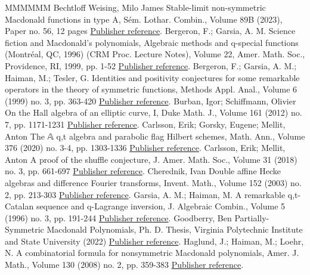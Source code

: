 \documentclass[11pt]{article}
\theoremstyle{definition}
\numberwithin{equation}{section}
\begin{document}
\begin{thebibliography}{MMMMMM}
 Bechtloff Weising, Milo James Stable-limit non-symmetric Macdonald functions in type A, Sém. Lothar. Combin., Volume 89B (2023), Paper no. 56, 12 pages \href{https://alco.centre-mersenne.org/articles/10.5802/alco.395/#MBW}{Publisher reference}.
 Bergeron, F.; Garsia, A. M. Science fiction and Macdonald’s polynomials, Algebraic methods and q-special functions (Montréal, QC, 1996) (CRM Proc. Lecture Notes), Volume 22, Amer. Math. Soc., Providence, RI, 1999, pp. 1-52 \href{https://alco.centre-mersenne.org/articles/10.5802/alco.395/#BGSciFi}{Publisher reference}.
 Bergeron, F.; Garsia, A. M.; Haiman, M.; Tesler, G. Identities and positivity conjectures for some remarkable operators in the theory of symmetric functions, Methods Appl. Anal., Volume 6 (1999) no. 3, pp. 363-420 \href{https://alco.centre-mersenne.org/articles/10.5802/alco.395/#BGHT}{Publisher reference}.
 Burban, Igor; Schiffmann, Olivier On the Hall algebra of an elliptic curve, I, Duke Math. J., Volume 161 (2012) no. 7, pp. 1171-1231 \href{https://alco.centre-mersenne.org/articles/10.5802/alco.395/#BS}{Publisher reference}.
 Carlsson, Erik; Gorsky, Eugene; Mellit, Anton The 𝔸 q,t  algebra and parabolic flag Hilbert schemes, Math. Ann., Volume 376 (2020) no. 3-4, pp. 1303-1336 \href{https://alco.centre-mersenne.org/articles/10.5802/alco.395/#GCM_2017}{Publisher reference}.
 Carlsson, Erik; Mellit, Anton A proof of the shuffle conjecture, J. Amer. Math. Soc., Volume 31 (2018) no. 3, pp. 661-697 \href{https://alco.centre-mersenne.org/articles/10.5802/alco.395/#CM_2015}{Publisher reference}.
 Cherednik, Ivan Double affine Hecke algebras and difference Fourier transforms, Invent. Math., Volume 152 (2003) no. 2, pp. 213-303 \href{https://alco.centre-mersenne.org/articles/10.5802/alco.395/#C_2003}{Publisher reference}.
 Garsia, A. M.; Haiman, M. A remarkable q,t-Catalan sequence and q-Lagrange inversion, J. Algebraic Combin., Volume 5 (1996) no. 3, pp. 191-244 \href{https://alco.centre-mersenne.org/articles/10.5802/alco.395/#GHCat}{Publisher reference}.
 Goodberry, Ben Partially-Symmetric Macdonald Polynomials, Ph. D. Thesis, Virginia Polytechnic Institute and State University (2022) \href{https://alco.centre-mersenne.org/articles/10.5802/alco.395/#Goodberry}{Publisher reference}.
 Haglund, J.; Haiman, M.; Loehr, N. A combinatorial formula for nonsymmetric Macdonald polynomials, Amer. J. Math., Volume 130 (2008) no. 2, pp. 359-383 \href{https://alco.centre-mersenne.org/articles/10.5802/alco.395/#haglund2007combinatorial}{Publisher reference}.

\end{thebibliography}
\end{document}
